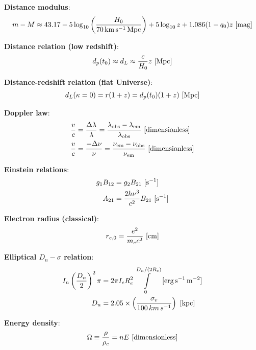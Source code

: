 \documentclass[a4paper,11pt]{article}
\begin{document}
{\noindent}\textbf{Distance modulus}:
\begin{align*}
    m - M \approx 43.17 - 5\log_{10} \left(\frac{H_0}{70\,{\rm km\,s^{-1}\,Mpc}}\right) + 5\log_{10}z + 1.086(1-q_0)z ~ [{\rm mag}]
\end{align*}

{\noindent}\textbf{Distance relation (low redshift)}:
\begin{align*}
    d_p(t_0) \approx d_L \approx \frac{c}{H_0}z ~ [{\rm Mpc}]
\end{align*}

{\noindent}\textbf{Distance-redshift relation (flat Universe)}:
\begin{align*}
    d_L(\kappa=0) = r(1+z) = d_p(t_0)(1+z) ~ [{\rm Mpc}]
\end{align*}

{\noindent}\textbf{Doppler law}:
\begin{align*}
    \frac{v}{c} &= \frac{\Delta\lambda}{\lambda} =  \frac{\lambda_\mathrm{obs}-\lambda_\mathrm{em}}{\lambda_\mathrm{obs}} ~ [{\rm dimensionless}] \\
    \frac{v}{c} &= \frac{-\Delta\nu}{\nu} =  \frac{\nu_\mathrm{em}-\nu_\mathrm{obs}}{\nu_\mathrm{em}} ~ [{\rm dimensionless}]
\end{align*}

{\noindent}\textbf{Einstein relations}:
\begin{align*}
    g_1B_{12} &= g_2B_{21} ~ [{\rm s^{-1}}] \\
    A_{21}    &= \frac{2h\nu^3}{c^2}B_{21}  ~ [{\rm s^{-1}}]
\end{align*}

{\noindent}\textbf{Electron radius (classical)}:
\begin{align*}
    r_{e,0} = \frac{e^2}{m_ec^2} ~ [{\rm cm}]
\end{align*}

{\noindent}\textbf{Elliptical $D_n-\sigma$ relation}:
\begin{align*}
    I_n\left(\frac{D_n}{2}\right)^2\pi &= 2\pi I_eR_e^2 \int\limits_0^{D_n/(2R_e)} ~ [{\rm erg\,s^{-1}\,m^{-2}}] \\
    D_n &= 2.05\times\left(\frac{\sigma_v}{100\,km\,s^{-1}}\right) ~ [{\rm kpc}]
\end{align*}

{\noindent}\textbf{Energy density}:
\begin{align*}
    \Omega \equiv \dfrac{\rho}{\rho_c} = nE ~ [{\rm dimensionless}]
\end{align*}
\end{document}

